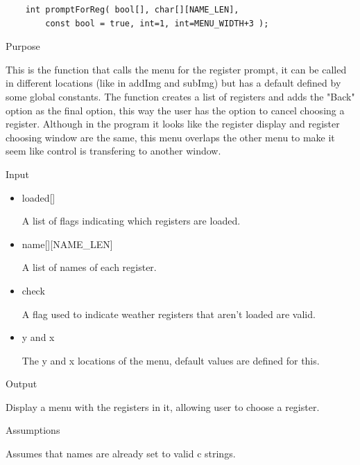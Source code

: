 \documentclass[pdftex, 11pt]{article}
\begin{document}
\begin{description}
\begin{lstlisting}
	int promptForReg( bool[], char[][NAME_LEN], 
		const bool = true, int=1, int=MENU_WIDTH+3 );
		\end{lstlisting}

		\begin{description}
			\item{Purpose}
				
				This is the function that calls the menu for the register prompt, it can be
				called in different locations (like in addImg and subImg) but has a default
				defined by some global constants.  The function creates a list of registers
				and adds the "Back" option as the final option, this way the user has the
				option to cancel choosing a register.  Although in the program it looks like
				the register display and register choosing window are the same, this menu
				overlaps the other menu to make it seem like control is transfering to another
				window.

			\item{Input}

				\begin{itemize}

					\item{loaded[]}

						A list of flags indicating which registers are loaded.

					\item{name[][NAME\_LEN]}

						A list of names of each register.

					\item{check}

						A flag used to indicate weather registers that aren't loaded are valid.

					\item{y and x}

						The y and x locations of the menu, default values are defined for this.

				\end{itemize}

			\item{Output}
				
				Display a menu with the registers in it, allowing user to
				choose a register.

			\item{Assumptions}

				Assumes that names are already set to valid c strings.

		\end{description}




\end{description}
\end{document}

